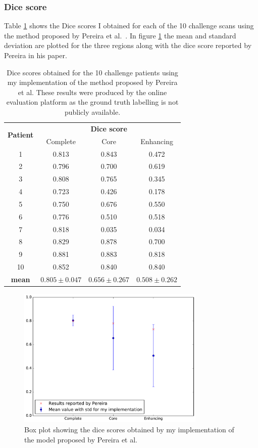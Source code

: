 \documentclass[12pt,a4paper,twoside,openright]{report}
\newlength\figureheight
\newlength\figurewidth
\begin{document}
\subsubsection{Dice score}
Table \ref{table:pereira_dice_results} shows the Dice scores I obtained for each of the 10 challenge scans using the method proposed by Pereira et al.\ \cite{pereira}. In figure \ref{pereira_box_plot} the mean and standard deviation are plotted for the three regions along with the dice score reported by Pereira in his paper. 
\begin{table}
\centering	
\begin{tabular}{ c | c c c} 
\multirow{2}{*}{\textbf{Patient}} & \multicolumn{3}{c}{\textbf{Dice score}} \\
 & Complete & Core & Enhancing \\
 \hline
1 & 0.813 & 0.843 & 0.472 \\
2 & 0.796 & 0.700 & 0.619 \\
3 & 0.808 & 0.765 & 0.345 \\
4 & 0.723 & 0.426 & 0.178 \\
5 & 0.750 & 0.676 & 0.550 \\
6 & 0.776 & 0.510 & 0.518 \\
7 & 0.818 & 0.035 & 0.034 \\
8 & 0.829 & 0.878 & 0.700 \\
9 & 0.881 & 0.883 & 0.818 \\
10 & 0.852 & 0.840 & 0.840 \\
\hline
\rule{0pt}{3ex}    
\textbf{mean} & $0.805 \pm 0.047$ & $0.656 \pm 0.267$ & $0.508 \pm 0.262$
\end{tabular}
\caption{Dice scores obtained for the 10 challenge patients using my implementation of the method proposed by Pereira et al. These results were produced by the online evaluation platform as the ground truth labelling is not publicly available.}
\label{table:pereira_dice_results}
\end{table}

\begin{figure}
	\centering
%	
	\includegraphics[width=0.8\textwidth]{plots/pereira_box_plot2}
	\caption{Box plot showing the dice scores obtained by my implementation of the model proposed by Pereira et al.}
	\label{pereira_box_plot}
\end{figure}
\end{document}
